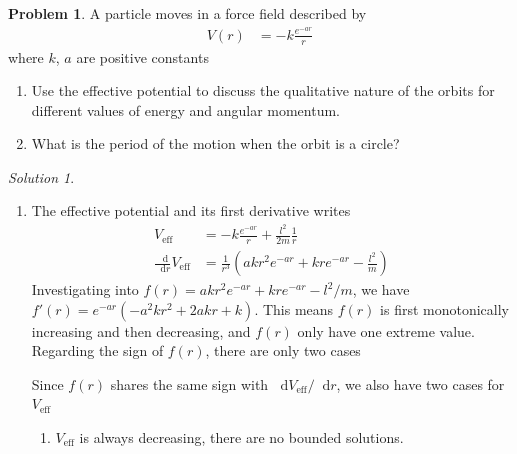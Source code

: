 \documentclass[twoside,11pt]{article}
\newcommand{\lms}{\fontfamily{lmss}\selectfont} %
\renewcommand*\d{\mathop{}\!\mathrm{d}}
\theoremstyle{definition}
\newtheorem{problem}{\lms Problem}
\theoremstyle{remark}
\newtheorem*{solution}{\lms Solution}
\begin{document}
\begin{problem}
A particle moves in a force field described by
\begin{align*}
    V(r) &= -k\frac{e^{-ar}}{r}
\end{align*}
where $k$, $a$ are positive constants
\begin{enumerate}[label=\alph*)]
    \item Use the effective potential to discuss the qualitative nature of the orbits for different values
    of energy and angular momentum.
    \item What is the period of the motion when the orbit is a circle?
\end{enumerate}
\end{problem}
\begin{solution}~
\begin{enumerate}[label=\alph*)]
\item The effective potential and its first derivative writes
\begin{align*}
    V_\text{eff} &= 
    -k\frac{e^{-ar}}{r} + \frac{l^2}{2m}\frac{1}{r}\\
    \frac{\d }{\d r} V_\text{eff} &=
    \frac{1}{r^3}\left(akr^2e^{-ar} + kre^{-ar} - \frac{l^2}{m}\right)
\end{align*}
Investigating into $f(r) = akr^2 e^{-ar} + kre^{-ar}-l^2/m$,
we have $f'(r) = e^{-ar}(-a^2kr^2 + 2akr + k)$.
This means $f(r)$ is first monotonically increasing and then decreasing,
and $f(r)$ only have one extreme value.
Regarding the sign of $f(r)$, there are only two cases
\begin{figure}[H]
    \centering
\end{figure}
Since $f(r)$ shares the same sign with $\d V_\text{eff}/\d r$,
we also have two cases for $V_\text{eff}$ 
\begin{enumerate}[label=\roman*.]
\item $V_\text{eff}$ is always decreasing, there are no bounded solutions.


\end{enumerate}
\end{enumerate}
\end{solution}
\end{document}
